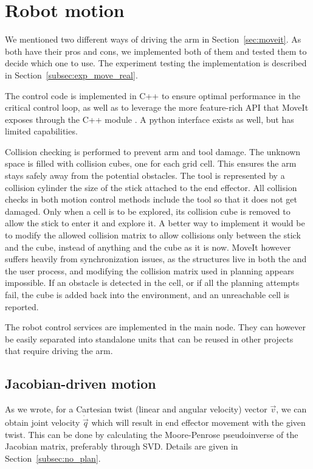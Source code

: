 \documentclass[buriama8_dp.tex]{subfiles}
\begin{document}
\section{Robot motion}
\label{sec:rob_impl}

We mentioned two different ways of driving the arm in Section~\ref{sec:moveit}. As both have their pros and cons, we implemented both of them and tested them to decide which one to use. The experiment testing the implementation is described in Section~\ref{subsec:exp_move_real}.

The control code is implemented in C++ to ensure optimal performance in the critical control loop, as well as to leverage the more feature-rich API that MoveIt exposes through the C++ module . A python interface exists as well, but has limited capabilities.

Collision checking is performed to prevent arm and tool damage. The unknown space is filled with collision cubes, one for each grid cell. This ensures the arm stays safely away from the potential obstacles. The tool is represented by a collision cylinder the size of the stick attached to the end effector. All collision checks in both motion control methods include the tool so that it does not get damaged. Only when a cell is to be explored, its collision cube is removed to allow the stick to enter it and explore it. A better way to implement it would be to modify the allowed collision matrix to allow collisions only between the stick and the cube, instead of anything and the cube as it is now. MoveIt however suffers heavily from synchronization issues, as the structures live in both the  and the user process, and modifying the collision matrix used in planning appears impossible. If an obstacle is detected in the cell, or if all the planning attempts fail, the cube is added back into the environment, and an unreachable cell is reported.

The robot control services are implemented in the main node. They can however be easily separated into standalone units that can be reused in other projects that require driving the arm.

\subsection{Jacobian-driven motion}
\label{subsec:impl_drv_jacob}

As we wrote, for a Cartesian twist (linear and angular velocity) vector \(\vec v\), we can obtain joint velocity \(\dot{\vec q}\) which will result in end effector movement with the given twist. This can be done by calculating the Moore-Penrose pseudoinverse of the Jacobian matrix, preferably through SVD. Details are given in Section~\ref{subsec:no_plan}.
\end{document}

